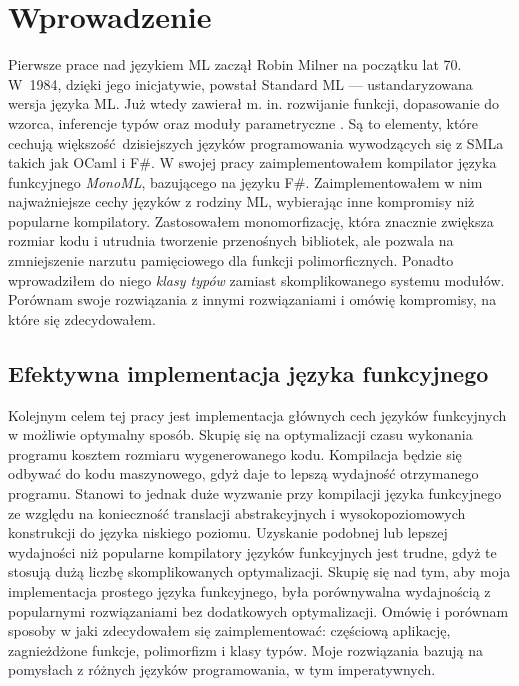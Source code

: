 \documentclass[declaration,shortabstract]{iithesis}
\author         {Mateusz Lewko}
\date           {}                     %
\begin{document}

\chapter{Wprowadzenie}

Pierwsze prace nad językiem ML zaczął Robin Milner na początku lat 70. W~1984, 
dzięki jego inicjatywie, powstał Standard ML --- ustandaryzowana wersja języka 
ML. Już wtedy zawierał m. in. rozwijanie funkcji, dopasowanie do wzorca, 
inferencje typów oraz moduły parametryczne \cite{sml_proposal}. Są to elementy,
które cechują większość dzisiejszych języków programowania 
wywodzących się z SMLa takich jak OCaml i F\#. W 
swojej pracy zaimplementowałem kompilator języka funkcyjnego \textit{MonoML}, 
bazującego na języku F\#. Zaimplementowałem w nim najważniejsze cechy języków 
z rodziny ML, wybierając inne kompromisy niż popularne kompilatory. 
Zastosowałem monomorfizację, która znacznie zwiększa rozmiar kodu i utrudnia
tworzenie przenośnych bibliotek, ale pozwala na zmniejszenie narzutu pamięciowego 
dla funkcji polimorficznych.
Ponadto wprowadziłem do niego \textit{klasy typów} zamiast skomplikowanego 
systemu modułów. Porównam swoje rozwiązania z innymi rozwiązaniami i omówię 
kompromisy, na które się zdecydowałem.


\section{Efektywna implementacja języka funkcyjnego}

Kolejnym celem tej pracy jest implementacja głównych cech języków funkcyjnych w
możliwie optymalny sposób. Skupię się na optymalizacji czasu wykonania 
programu kosztem rozmiaru wygenerowanego kodu. Kompilacja będzie się odbywać 
do kodu maszynowego, gdyż daje to lepszą wydajność otrzymanego programu. 
Stanowi to jednak duże wyzwanie przy kompilacji języka funkcyjnego ze względu 
na konieczność translacji abstrakcyjnych i wysokopoziomowych konstrukcji do 
języka niskiego poziomu. Uzyskanie 
podobnej lub lepszej wydajności niż popularne kompilatory języków funkcyjnych
jest trudne,
gdyż te stosują dużą liczbę skomplikowanych optymalizacji. Skupię się nad tym, 
aby moja implementacja prostego języka funkcyjnego, była porównywalna 
wydajnością 
z popularnymi rozwiązaniami bez dodatkowych optymalizacji. Omówię i porównam 
sposoby w jaki zdecydowałem się 
zaimplementować:
częściową aplikację, zagnieżdżone funkcje, polimorfizm i klasy typów. Moje 
rozwiązania bazują na pomysłach z różnych języków programowania, w tym 
imperatywnych. 
\end{document}
